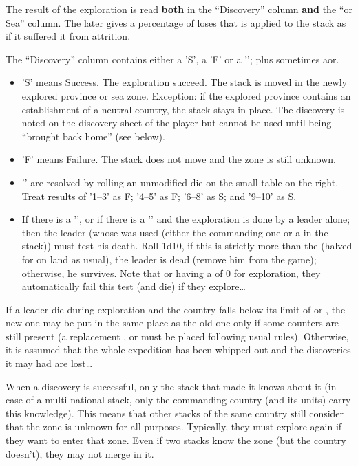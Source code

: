 The result of the exploration is read \textbf{both} in the ``Discovery''
column \textbf{and} the ``\ROTW or Sea'' column. The later gives a percentage
of loses that is applied to the stack as if it suffered it from
attrition.

The ``Discovery'' column contains either a 'S', a 'F' or a '\undemi'; plus
sometimes a\myxxa or\myxxc.
\begin{itemize}
\item 'S' means Success. The exploration succeed. The stack is moved in the
  newly explored province or sea zone. Exception: if the explored province
  contains an establishment of a neutral country, the stack stays in
  place. The discovery is noted on the discovery sheet of the player but
  cannot be used until being ``brought back home'' (see below).
\item 'F' means Failure. The stack does not move and the zone is still
  unknown.
\item '\undemi' are resolved by rolling an unmodified die on the small table
  on the right. Treat results of '1--3' as F\xxa; '4--5' as F\xxc; '6--8'
  as S\xxa; and '9--10' as S\xxc.
\item If there is a '\xxa', or if there is a '\xxc' and the exploration is
  done by a leader alone; then the leader (whose \Man was used (either the
  commanding one or a \LeaderMis in the stack)) must test his death. Roll
  1d10, if this is strictly more than the \Man (halved for \LeaderE on land as
  usual), the leader is dead (remove him from the game); otherwise, he
  survives. Note that \LeaderA or \LeaderG having a \Man of 0 for exploration,
  they automatically fail this test (and die) if they explore\ldots
\end{itemize}

If a leader die during exploration and the country falls below its limit of
\LeaderC or \LeaderE, the new one may be put in the same place as the old one
only if some counters are still present (a replacement \LeaderA, \LeaderG or
\LeaderGov must be placed following usual rules). Otherwise, it is assumed
that the whole expedition has been whipped out and the discoveries it may had
are lost\ldots

\smallskip

When a discovery is successful, only the stack that made it knows about it (in
case of a multi-national stack, only the commanding country (and its units)
carry this knowledge). This means that other stacks of the same country still
consider that the zone is unknown for all purposes. Typically, they must
explore again if they want to enter that zone. Even if two stacks know the
zone (but the country doesn't), they may not merge in it.

